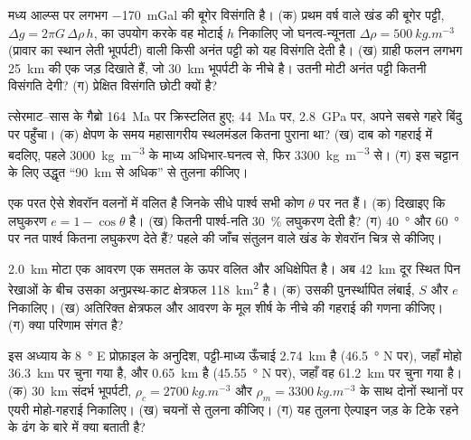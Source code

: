 \begin{exercise}[$\star\star$]\label{exo:b2:alpine-orogen:5}
मध्य आल्प्स पर लगभग \qty{-170}{mGal} की बूगेर विसंगति है। (क) प्रथम वर्ष वाले
खंड की बूगेर पट्टी, $\Delta g = 2\pi G\,\Delta\rho\,h$, का उपयोग करके वह मोटाई $h$ निकालिए जो
घनत्व-न्यूनता $\Delta\rho = \qty{500}{kg.m^{-3}}$ (प्रावार का स्थान लेती भूपर्पटी) वाली किसी अनंत पट्टी को
यह विसंगति देती है। (ख) ग्राही फलन लगभग \qty{25}{km} की एक जड़ दिखाते हैं, जो
\qty{30}{km} भूपर्पटी के नीचे है। उतनी मोटी अनंत पट्टी कितनी विसंगति देगी? (ग)
प्रेक्षित विसंगति छोटी क्यों है?
\end{exercise}

\begin{exercise}[$\star\star$]\label{exo:b2:alpine-orogen:6}
त्सेरमाट--सास  के गैब्रो \qty{164}{Ma} पर क्रिस्टलित हुए; 
\qty{44}{Ma} पर, \qty{2.8}{GPa} पर, अपने सबसे गहरे बिंदु पर पहुँचा। (क) क्षेपण के समय महासागरीय
स्थलमंडल कितना पुराना था? (ख) दाब को गहराई में बदलिए, पहले \qty{3000}{kg.m^{-3}} के माध्य
अधिभार-घनत्व से, फिर \qty{3300}{kg.m^{-3}} से। (ग) इस चट्टान के लिए उद्धृत
``\qty{90}{km} से अधिक'' से तुलना कीजिए।
\end{exercise}

\begin{exercise}[$\star\star$]\label{exo:b2:alpine-orogen:7}
एक परत ऐसे शेवरॉन वलनों में वलित है जिनके सीधे पार्श्व सभी कोण $\theta$ पर नत हैं।
(क) दिखाइए कि लघुकरण $e = 1 - \cos\theta$ है। (ख) कितनी पार्श्व-नति
\qty{30}{\percent} लघुकरण देती है? (ग) \qty{40}{\degree} और \qty{60}{\degree} पर नत पार्श्व
कितना लघुकरण देते हैं? पहले की जाँच संतुलन वाले खंड के शेवरॉन चित्र से कीजिए।
\end{exercise}

\begin{exercise}[$\star\star$]\label{exo:b2:alpine-orogen:8}
\qty{2.0}{km} मोटा एक आवरण एक समतल  के ऊपर वलित और अधिक्षेपित है। अब
\qty{42}{km} दूर स्थित पिन रेखाओं के बीच उसका अनुप्रस्थ-काट क्षेत्रफल \qty{118}{km^2} है। (क) उसकी पुनर्स्थापित
लंबाई, $S$ और $e$ निकालिए। (ख) अतिरिक्त क्षेत्रफल और आवरण के मूल शीर्ष के नीचे
 की गहराई की गणना कीजिए। (ग) क्या परिणाम संगत है?
\end{exercise}

\begin{exercise}[$\star\star$]\label{exo:b2:alpine-orogen:9}
इस अध्याय के \qty{8}{\degree} E प्रोफ़ाइल के अनुदिश, पट्टी-माध्य ऊँचाई
\qty{2.74}{km} है (\qty{46.5}{\degree} N पर), जहाँ मोहो \qty{36.3}{km} पर चुना गया है, और
\qty{0.65}{km} है (\qty{45.55}{\degree} N पर), जहाँ वह \qty{61.2}{km} पर चुना गया है। (क)
\qty{30}{km} संदर्भ भूपर्पटी, $\rho_c = \qty{2700}{kg.m^{-3}}$ और $\rho_m =
\qty{3300}{kg.m^{-3}}$ के साथ दोनों स्थानों पर एयरी मोहो-गहराई निकालिए। (ख) चयनों से तुलना कीजिए।
(ग) यह तुलना ऐल्पाइन जड़ के टिके रहने के ढंग के बारे में क्या बताती है?
\end{exercise}

